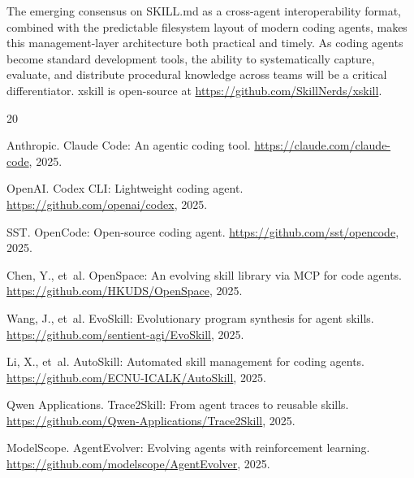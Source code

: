 \documentclass[11pt]{article}
\begin{document}
The emerging consensus on SKILL.md as a cross-agent interoperability format, combined with the predictable filesystem layout of modern coding agents, makes this management-layer architecture both practical and timely. As coding agents become standard development tools, the ability to systematically capture, evaluate, and distribute procedural knowledge across teams will be a critical differentiator. xskill is open-source at \url{https://github.com/SkillNerds/xskill}.




\begin{thebibliography}{20}

Anthropic.
\newblock Claude Code: An agentic coding tool.
\newblock \url{https://claude.com/claude-code}, 2025.

OpenAI.
\newblock Codex CLI: Lightweight coding agent.
\newblock \url{https://github.com/openai/codex}, 2025.

SST.
\newblock OpenCode: Open-source coding agent.
\newblock \url{https://github.com/sst/opencode}, 2025.

Chen, Y., et~al.
\newblock OpenSpace: An evolving skill library via MCP for code agents.
\newblock \url{https://github.com/HKUDS/OpenSpace}, 2025.

Wang, J., et~al.
\newblock EvoSkill: Evolutionary program synthesis for agent skills.
\newblock \url{https://github.com/sentient-agi/EvoSkill}, 2025.

Li, X., et~al.
\newblock AutoSkill: Automated skill management for coding agents.
\newblock \url{https://github.com/ECNU-ICALK/AutoSkill}, 2025.

Qwen Applications.
\newblock Trace2Skill: From agent traces to reusable skills.
\newblock \url{https://github.com/Qwen-Applications/Trace2Skill}, 2025.

ModelScope.
\newblock AgentEvolver: Evolving agents with reinforcement learning.
\newblock \url{https://github.com/modelscope/AgentEvolver}, 2025.


\end{thebibliography}
\end{document}
